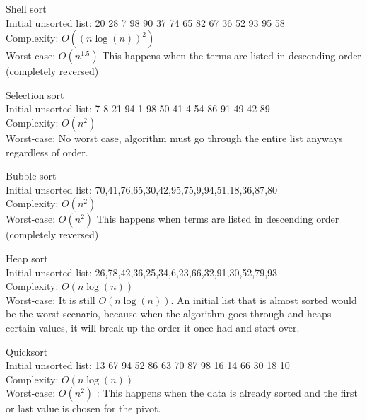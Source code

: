 \documentclass[12pt,letterpaper]{exam}
\begin{document}
\begin{questions}

\question
Shell sort
\\Initial unsorted list: 
20 28 7 98 90 37 74 65 82 67 36 52 93 95 58
\\Complexity: $O((n \log(n))^2)$
\\Worst-case: $O(n^{1.5})$ This happens when the terms are listed in descending order (completely reversed)


\question
Selection sort
\\Initial unsorted list:
7 8 21 94 1 98 50 41 4 54 86 91 49 42 89
\\Complexity: $O(n^2)$
\\Worst-case: No worst case, algorithm must go through the entire list anyways regardless of order.

\question
Bubble sort
\\Initial unsorted list:
70,41,76,65,30,42,95,75,9,94,51,18,36,87,80
\\Complexity: $O(n^2)$
\\Worst-case: $O(n^2)$ This happens when terms are listed in descending order (completely reversed)

\question
Heap sort
\\Initial unsorted list:
26,78,42,36,25,34,6,23,66,32,91,30,52,79,93
\\Complexity: $O(n \log(n))$
\\Worst-case: It is still $O(n \log(n))$. An initial list that is almost sorted would be the worst scenario, because when the algorithm goes through and heaps certain values, it will break up the order it once had and start over.

\question
Quicksort
\\Initial unsorted list:
13 67 94 52 86 63 70 87 98 16 14 66 30 18 10
\\Complexity: $O(n \log(n))$
\\Worst-case: $O(n^2)$ : This happens when the data is already sorted and the first or last value is chosen for the pivot.




\end{questions}
\end{document}
